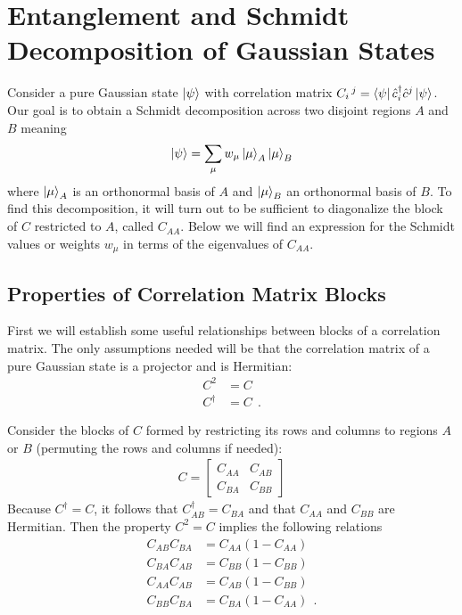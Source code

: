 \documentclass[aps, superscriptaddress, floatfix, onecolumn]{revtex4-2}
\begin{document}
\section{Entanglement and Schmidt Decomposition of Gaussian States}

Consider a pure Gaussian state $\ket{\psi}$ with correlation matrix $C_i\,^j = \bra{\psi} \hat{c}^\dagger_i \hat{c}^j \ket{\psi}$. 
Our goal is to obtain a Schmidt decomposition across two disjoint regions $A$ and $B$ meaning 
\begin{align}
\ket{\psi} = \sum_\mu w_\mu \ket{\mu}_A \ket{\mu}_B
\end{align}
where $\ket{\mu}_A$ is an orthonormal basis of $A$ and  $\ket{\mu}_B$ an orthonormal basis of $B$. 
To find this decomposition, it will turn out to be sufficient to diagonalize the block of $C$ restricted to $A$, called $C_{AA}$. Below we will find an
expression for the Schmidt values or weights $w_\mu$ in terms of the eigenvalues of $C_{AA}$.

\subsection{Properties of Correlation Matrix Blocks}

First we will establish some useful relationships between blocks of a correlation matrix. The only assumptions needed will be that the correlation matrix of
a pure Gaussian state is a projector and is Hermitian:
\begin{align}
C^2 & = C \label{eq:projector} \\
C^\dagger & = C \ \ . \label{eq:hermitian}
\end{align}

Consider the blocks of $C$ formed by restricting its rows and columns to regions $A$ or $B$ (permuting the rows and columns if needed):
\begin{align}
C = \begin{bmatrix}
C_{AA} & C_{AB} \\ 
C_{BA} & C_{BB} 
\end{bmatrix}
\end{align}
Because $C^\dagger = C$, it follows that $C^\dagger_{AB} = C_{BA}$ and that $C_{AA}$ and $C_{BB}$ are Hermitian.
Then the property $C^2=C$ implies the following relations
\begin{align}
C_{AB} C_{BA} & = C_{AA} (1- C_{AA})  \label{eq:proj1} \\
C_{BA} C_{AB} & = C_{BB} (1 - C_{BB}) \\
C_{AA} C_{AB} & = C_{AB} (1 - C_{BB}) \\
C_{BB} C_{BA} & = C_{BA} (1 - C_{AA})  \ \ .
\end{align}
\end{document}
